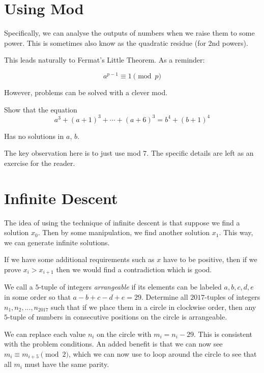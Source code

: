 \documentclass{article}
\theoremstyle{mytheoremstyle}
\theoremstyle{mytheoremstyle}
\theoremstyle{myproblemstyle}
\theoremstyle{myproblemstyle}
\begin{document}
    \section{Using Mod}
    Specifically, we can analyse the outputs of numbers when we raise them to some power. This is sometimes also know as the quadratic residue (for 2nd powers).

    This leads naturally to Fermat's Little Theorem. As a reminder:

    \begin{theorem}
        \[a^{p-1} \equiv 1 \pmod{p}\]
    \end{theorem}

    However, problems can be solved with a clever mod.

    \begin{example}[RMO 2017/2]
        Show that the equation 
        \[a^3 + (a+1)^3 + \cdots + (a+6)^3 = b^4 + (b+1)^4\]

        Has no solutions in $a$, $b$.
    \end{example}

    The key observation here is to just use mod $7$. The specific details are left as an exercise for the reader.

    \section{Infinite Descent}
    The idea of using the technique of infinite descent is that suppose we find a solution $x_0$. Then by some manipulation, we find another solution $x_1$. This way, we can generate infinite solutions.

    If we have some additional requirements such as $x$ have to be positive, then if we prove $x_i > x_{i+1}$ then we would find a contradiction which is good.

    \begin{example}[APMO 2017/1]
        We call a $5$-tuple of integers \textit{arrangeable} if its elements can be labeled $a, b, c, d, e$ in some order so that $a-b+c-d+e=29$. Determine all $2017$-tuples of integers $n_1, n_2, . . . , n_{2017}$ such that if we place them in a circle in clockwise order, then any $5$-tuple of numbers in consecutive positions on the circle is arrangeable.
    \end{example}

    We can replace each value $n_i$ on the circle with $m_i = n_i - 29$. This is consistent with the problem conditions. An added benefit is that we can now see $m_i \equiv m_{i+5} \pmod{2}$, which we can now use to loop around the circle to see that all $m_i$ must have the same parity.
\end{document}

